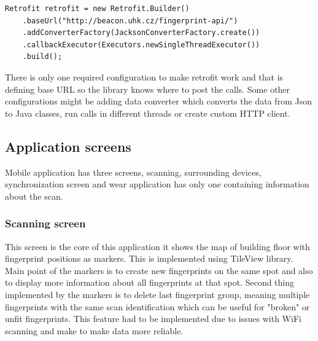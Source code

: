 \begin{lstlisting}[caption=Retrofit configuration example.]
Retrofit retrofit = new Retrofit.Builder()
	.baseUrl("http://beacon.uhk.cz/fingerprint-api/")
	.addConverterFactory(JacksonConverterFactory.create())
	.callbackExecutor(Executors.newSingleThreadExecutor())
	.build();
\end{lstlisting}

There is only one required configuration to make retrofit work and that is defining base URL so the library knows where to post the calls. Some other configurations might be adding data converter which converts the data from Json to Java classes, run calls in different threads or create custom HTTP client.

\subsection{Application screens}\label{subsec:ApplicationScreens}
Mobile application has three screens, scanning, surrounding devices, synchronization screen and wear application has only one containing information about the scan.

\subsubsection{Scanning screen}\label{subsec:ScanningScreen}
This screen is the core of this application it shows the map of building floor with fingerprint positions as markers. This is implemented using TileView library. Main point of the markers is to create new fingerprints on the same spot and also to display more information about all fingerprints at that spot. Second thing implemented by the markers is to delete last fingerprint group, meaning multiple fingerprints with the same scan identification which can be useful for "broken" or unfit fingerprints. This feature had to be implemented due to issues with WiFi scanning and make to make data more reliable.

